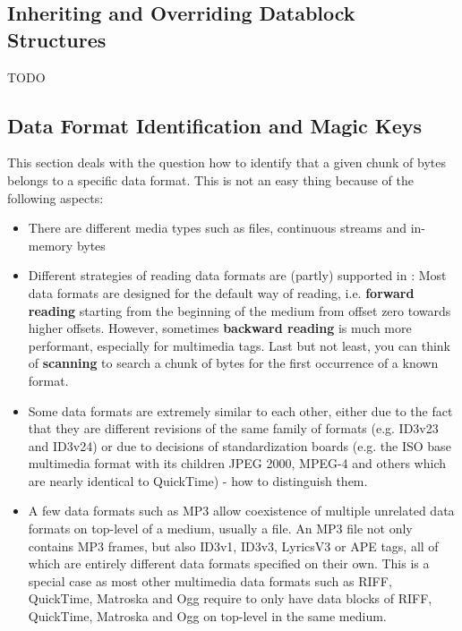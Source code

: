 \subsection{Inheriting and Overriding Datablock Structures}%
\label{sec:InheritingandOverridingDatablockStructures}%

TODO

\subsection{Data Format Identification and Magic Keys}%
\label{sec:MagicKeys}%

This section deals with the question how to identify that a given chunk of bytes belongs to a specific data format. This is not an easy thing because of the following aspects:
\begin{itemize}
\item There are different media types such as files, continuous streams and in-memory bytes
\item Different strategies of reading data formats are (partly) supported in \LibName{}: Most data formats are designed for the default way of reading, i.e. \textbf{forward reading} starting from the beginning of the medium from offset zero towards higher offsets. However, sometimes \textbf{backward reading} is much more performant, especially for multimedia tags. Last but not least, you can think of \textbf{scanning} to search a chunk of bytes for the first occurrence of a known format.
\item Some data formats are extremely similar to each other, either due to the fact that they are different revisions of the same family of formats (e.g. ID3v23 and ID3v24) or due to decisions of standardization boards (e.g. the ISO base multimedia format with its children JPEG 2000, MPEG-4 and others which are nearly identical to QuickTime) - how to distinguish them.
\item A few data formats such as MP3 allow coexistence of multiple unrelated data formats on top-level of a medium, usually a file. An MP3 file not only contains MP3 frames, but also ID3v1, ID3v3, LyricsV3 or APE tags, all of which are entirely different data formats specified on their own. This is a special case as most other multimedia data formats such as RIFF, QuickTime, Matroska and Ogg require to only have data blocks of RIFF, QuickTime, Matroska and Ogg on top-level in the same medium.
\end{itemize}

